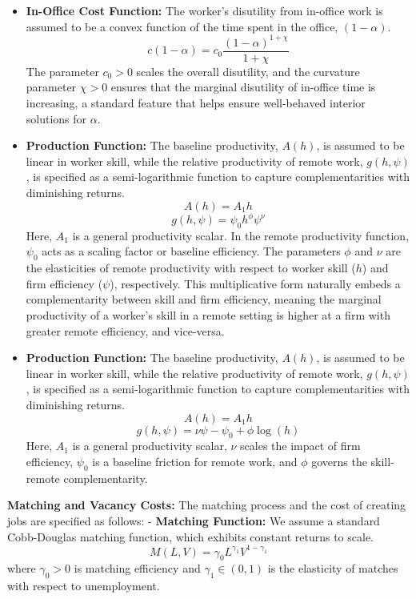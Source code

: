\documentclass[
  11pt,
  letterpaper,
  DIV=11,
  numbers=noendperiod]{scrartcl}
\begin{document}
\begin{itemize}
\item
  \textbf{In-Office Cost Function:} The worker's disutility from
  in-office work is assumed to be a convex function of the time spent in
  the office, \((1-\alpha)\).
  \[c(1-\alpha) = c_0 \frac{(1-\alpha)^{1+\chi}}{1+\chi}\] The parameter
  \(c_0 > 0\) scales the overall disutility, and the curvature parameter
  \(\chi > 0\) ensures that the marginal disutility of in-office time is
  increasing, a standard feature that helps ensure well-behaved interior
  solutions for \(\alpha\).
\item
  \textbf{Production Function:} The baseline productivity, \(A(h)\), is
  assumed to be linear in worker skill, while the relative productivity
  of remote work, \(g(h, \psi)\), is specified as a semi-logarithmic
  function to capture complementarities with diminishing returns.
  \[A(h) = A_1 h\] \[g(h, \psi) = \psi_0 h^\phi \psi^\nu\] Here, \(A_1\)
  is a general productivity scalar. In the remote productivity function,
  \(\psi_{0}\) acts as a scaling factor or baseline efficiency. The
  parameters \(\phi\) and \(\nu\) are the elasticities of remote
  productivity with respect to worker skill (\(h\)) and firm efficiency
  (\(\psi\)), respectively. This multiplicative form naturally embeds a
  complementarity between skill and firm efficiency, meaning the
  marginal productivity of a worker's skill in a remote setting is
  higher at a firm with greater remote efficiency, and vice-versa.
\item
  \textbf{Production Function:} The baseline productivity, \(A(h)\), is
  assumed to be linear in worker skill, while the relative productivity
  of remote work, \(g(h, \psi)\), is specified as a semi-logarithmic
  function to capture complementarities with diminishing returns.
  \[A(h) = A_1 h\] \[g(h, \psi) = \nu\psi - \psi_0 + \phi\log(h)\] Here,
  \(A_1\) is a general productivity scalar, \(\nu\) scales the impact of
  firm efficiency, \(\psi_0\) is a baseline friction for remote work,
  and \(\phi\) governs the skill-remote complementarity.
\end{itemize}

\textbf{Matching and Vacancy Costs:} The matching process and the cost
of creating jobs are specified as follows: - \textbf{Matching Function:}
We assume a standard Cobb-Douglas matching function, which exhibits
constant returns to scale. \[
M(L, V) = \gamma_{0} L^{\gamma_{1}} V^{1-\gamma_{1}}
\] where \(\gamma_0 > 0\) is matching efficiency and
\(\gamma_1 \in (0,1)\) is the elasticity of matches with respect to
unemployment.
\end{document}
